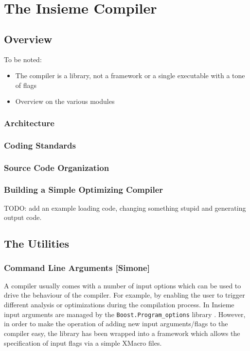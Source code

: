 \chapter{The Insieme Compiler} \label{cap:compiler}

\section{Overview}

To be noted:
\begin{itemize}
  \item The compiler is a library, not a framework or a single executable with a
  tone of flags
  \item Overview on the various modules
\end{itemize}

\subsection{Architecture}
\subsection{Coding Standards}
\subsection{Source Code Organization}
\subsection{Building a Simple Optimizing Compiler}
\label{cap:compiler:sec:overview:sub:building} TODO: add an example loading
code, changing something stupid and generating output code.

\section{The Utilities}

\subsection{Command Line Arguments [Simone]}

\label{Command.Line.Args}

A compiler usually comes with a number of input options which can be used to
drive the behaviour of the compiler. For example, by enabling the user to
trigger different analysis or optimizations during the compilation process.
In Insieme input arguments are managed by the {\tt Boost.Program\_options}
library \cite{boost_program_options}. However, in order to make the operation of
adding new input arguments/flags to the compiler easy, the library has been
wrapped into a framework which allows the specification of input flags via a
simple XMacro files. 


